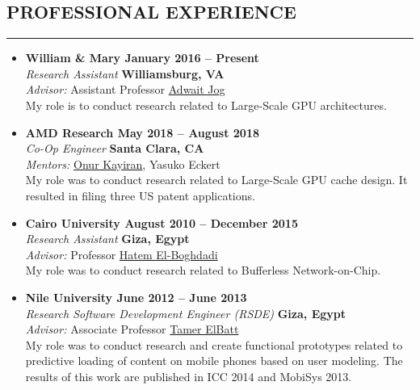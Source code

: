 \documentclass[10pt,a4]{article}
\begin{document}
\subsection*{PROFESSIONAL EXPERIENCE}
\hrule
\vspace{0.2cm}
\begin{itemize}

\item{\bf William \& Mary \hfill {\bf January 2016 -- Present}}\\
{\it Research Assistant} \hfill {\bf Williamsburg, VA}\\
{\it Advisor:} Assistant Professor \href{http://www.cs.wm.edu/~adwait/}{Adwait Jog} \\
My role is to conduct research related to Large-Scale GPU architectures. 

\item{\bf AMD Research \hfill {\bf May 2018 -- August 2018}}\\
{\it Co-Op Engineer} \hfill {\bf Santa Clara, CA}\\
{\it Mentors:} \href{https://okayiran.github.io/}{Onur Kayiran}, Yasuko Eckert \\
My role was to conduct research related to Large-Scale GPU cache design. It resulted in filing three US patent applications. 

\item{\bf Cairo University \hfill {\bf August 2010 -- December 2015}}\\
{\it Research Assistant} \hfill {\bf Giza, Egypt}\\
{\it Advisor:} Professor \href{http://scholar.cu.edu.eg/?q=helboghdadi}{Hatem El-Boghdadi}\\
My role was to conduct research related to Bufferless Network-on-Chip.

\item{\bf Nile University \hfill {\bf June 2012 -- June 2013}}\\
{\it Research Software Development Engineer (RSDE)} \hfill {\bf Giza, Egypt}\\
{\it Advisor:} Associate Professor \href{https://sites.google.com/site/telbatt/}{Tamer ElBatt}\\
My role was to conduct research and create functional prototypes related to predictive loading of content on mobile phones based on user modeling. The results of this work are published in ICC 2014 and MobiSys 2013. 


\end{itemize}
\end{document}
